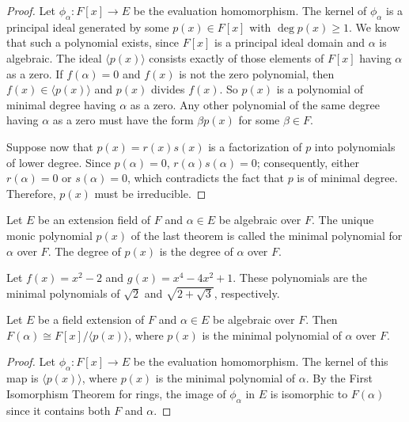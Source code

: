  
\begin{proof}
Let $\phi_{\alpha} : F[x] \rightarrow E$ be the evaluation
homomorphism. The kernel of $\phi_{\alpha}$ is a principal ideal
generated by some $p(x) \in F[x]$ with $\deg p(x) \geq 1$. We know
that such a polynomial exists, since $F[x]$ is a principal ideal domain
and $\alpha$ is algebraic. The ideal $\langle p(x) \rangle$ consists
exactly of those elements of $F[x]$ having $\alpha$ as a zero. If $f(
\alpha ) = 0$ and $f(x)$ is not the zero polynomial, then $f(x) \in
\langle p(x) \rangle$ and $p(x)$ divides $f(x)$. So $p(x)$ is a
polynomial of minimal degree having $\alpha$ as a zero. Any other
polynomial of the same degree having $\alpha$ as a zero must have the
form $\beta p( x)$ for some $\beta \in F$. 
 

Suppose now that $p(x) = r(x) s(x)$ is a factorization of $p$ into
polynomials of lower degree. Since $p( \alpha ) = 0$, $r( \alpha ) s(
\alpha ) = 0$; consequently, either \mbox{$r( \alpha )=0$} or
\mbox{$s( \alpha ) = 0$}, which contradicts the fact that $p$ is of
minimal degree. Therefore, $p(x)$ must be irreducible.
\end{proof}
 

\medskip
 
 
Let $E$ be an extension field of $F$ and $\alpha \in E$ be algebraic
over $F$. The unique monic polynomial $p(x)$ of the last theorem is
called the {\bfi minimal
polynomial\/} for
$\alpha$ over $F$. The degree of $p(x)$ is the {\bfi degree of
$\alpha$ over $F$}. 


\begin{example}{}
Let $f(x) = x^2 - 2$ and $g(x) = x^4 - 4 x^2 + 1$. These polynomials
are the minimal polynomials of $\sqrt{2}$ and $\sqrt{2 + \sqrt{3} }$,
respectively. 
\end{example}
 

\begin{proposition}\label{fields:min_poly_prop}
Let $E$ be a field extension of $F$ and $\alpha \in E$ be algebraic
over $F$.  Then $F( \alpha ) \cong F[x] / \langle p(x) \rangle$, where
$p(x)$ is the minimal polynomial of $\alpha$ over $F$.
\end{proposition}


\begin{proof} %
Let $\phi_{\alpha} : F[x] \rightarrow E$ be the evaluation
homomorphism. The kernel of this map is $\langle p(x) \rangle$, where $p(x)$ is the minimal polynomial  of $\alpha$. By the First Isomorphism Theorem for rings, the image of
$\phi_{\alpha}$ in $E$ is isomorphic to $F( \alpha )$ since it
contains both $F$ and $\alpha$.
\end{proof}
 

